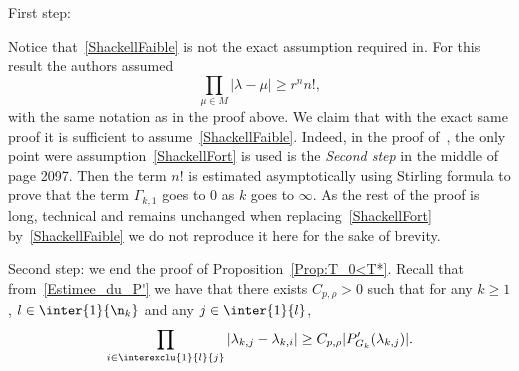 \begin{proofc}
\begin{step}{First step:}
\begin{rema}
Notice that~\eqref{ShackellFaible} is not the exact assumption required in\linebreak\cite[Theorem~3.8]{AmmarKhodjaBenabdallahGonzalez-BurgosdeTeresa:2014}. For this result the authors assumed
\begin{equation}\label{ShackellFort}
\prod_{\mu\in M} |\lambda- \mu| \geq r^n n!,
\end{equation}
with the same notation as in the proof above. We claim that with the exact same proof it is sufficient to assume~\eqref{ShackellFaible}. Indeed, in the proof of~\cite[Theorem~3.8]{AmmarKhodjaBenabdallahGonzalez-BurgosdeTeresa:2014}, the only point were assumption~\eqref{ShackellFort} is used is the \emph{Second step} in the middle of page 2097. Then the term $n!$ is estimated asymptotically using Stirling formula to prove that the term $\Gamma_{k,1}$ goes to $0$ as $k$ goes to $\infty$. As the rest of the proof is long, technical and remains unchanged when replacing~\eqref{ShackellFort} by~\eqref{ShackellFaible} we do not reproduce it here for the sake of brevity.
\end{rema}
\end{step}

\begin{step}{Second step:}
we end the proof of Proposition~\ref{Prop:T_0<T*}. Recall that from~\eqref{Estimee_du_P'} we have that there exists $C_{p, \rho}>0$ such that for any $k\geq 1$, $l \in \inter{1}{\n_k}$ and any $j \in \inter{1}{l}$,
\begin{equation*}
\prod_{i\in \interexclu{1}{l}{j}} | \lambda_{k,j} - \lambda_{k,i}| \geq C_{p,\rho} |P_{G_k}' (\lambda_{k,j}) |.
\end{equation*}



\end{step}
\end{proofc}
